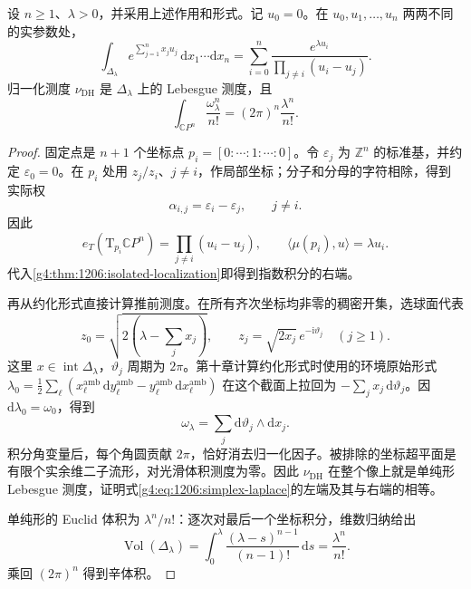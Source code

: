 \begin{proposition}\label{g4:prop:1206:projective-localization}
	设 \(n\ge1\)、\(\lambda>0\)，并采用上述作用和形式。记 \(u_0=0\)。在 \(u_0,u_1,\ldots,u_n\) 两两不同的实参数处，
	\begin{equation}\label{g4:eq:1206:simplex-laplace}
		\int_{\Delta_\lambda}e^{\sum_{j=1}^n x_ju_j}\,
		\mathrm{d}x_1\cdots\mathrm{d}x_n
		=\sum_{i=0}^n
		\frac{e^{\lambda u_i}}{\prod_{j\ne i}(u_i-u_j)}.
	\end{equation}
	归一化测度 \(\nu_{\mathrm{DH}}\) 是 \(\Delta_\lambda\) 上的 Lebesgue 测度，且
	\begin{equation}\label{g4:eq:1206:projective-volume}
		\int_{\mathbb CP^n}\frac{\omega_\lambda^n}{n!}
		=(2\pi)^n\frac{\lambda^n}{n!}.
	\end{equation}
\end{proposition}
\begin{proof}
	固定点是 \(n+1\) 个坐标点 \(p_i=[0:\cdots:1:\cdots:0]\)。令 \(\varepsilon_j\) 为 \(\mathbb Z^n\) 的标准基，并约定 \(\varepsilon_0=0\)。在 \(p_i\) 处用 \(z_j/z_i\)、\(j\ne i\)，作局部坐标；分子和分母的字符相除，得到实际权
	\[
		\alpha_{i,j}=\varepsilon_i-\varepsilon_j,\qquad j\ne i.
	\]
	因此
	\[
		e_T(\mathrm{T}_{p_i}\mathbb CP^n)=\prod_{j\ne i}(u_i-u_j),
		\qquad \langle\mu(p_i),u\rangle=\lambda u_i.
	\]
	代入\cref{g4:thm:1206:isolated-localization}即得到指数积分的右端。

	再从约化形式直接计算推前测度。在所有齐次坐标均非零的稠密开集，选球面代表
	\[
		z_0=\sqrt{2\left(\lambda-\sum_jx_j\right)},\qquad
		z_j=\sqrt{2x_j}\,e^{-\mathrm{i}\vartheta_j}\quad(j\ge1).
	\]
	这里 \(x\in\operatorname{int}\Delta_\lambda\)，\(\vartheta_j\) 周期为 \(2\pi\)。第十章计算约化形式时使用的环境原始形式
	\(\lambda_0=\frac12\sum_\ell(x_\ell^{\mathrm{amb}}\,\mathrm{d}y_\ell^{\mathrm{amb}}-y_\ell^{\mathrm{amb}}\,\mathrm{d}x_\ell^{\mathrm{amb}})\)
	在这个截面上拉回为 \(-\sum_jx_j\,\mathrm{d}\vartheta_j\)。因 \(\mathrm{d}\lambda_0=\omega_0\)，得到
	\[
		\omega_\lambda=\sum_j\mathrm{d}\vartheta_j\wedge\mathrm{d}x_j.
	\]
	积分角变量后，每个角圆贡献 \(2\pi\)，恰好消去归一化因子。被排除的坐标超平面是有限个实余维二子流形，对光滑体积测度为零。因此 \(\nu_{\mathrm{DH}}\) 在整个像上就是单纯形 Lebesgue 测度，证明式\eqref{g4:eq:1206:simplex-laplace}的左端及其与右端的相等。

	单纯形的 Euclid 体积为 \(\lambda^n/n!\)：逐次对最后一个坐标积分，维数归纳给出
	\[
		\operatorname{Vol}(\Delta_\lambda)
		=\int_0^\lambda\frac{(\lambda-s)^{n-1}}{(n-1)!}\,\mathrm{d}s
		=\frac{\lambda^n}{n!}.
	\]
	乘回 \((2\pi)^n\) 得到辛体积。
\end{proof}

